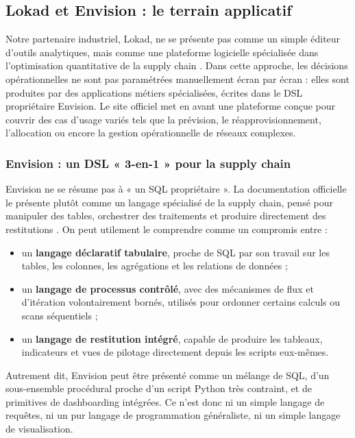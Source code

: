 \subsection{Lokad et Envision : le terrain applicatif}

Notre partenaire industriel, Lokad, ne se présente pas comme un simple éditeur d'outils analytiques, mais comme une plateforme logicielle spécialisée dans l'optimisation quantitative de la supply chain \cite{LokadEnvision}. Dans cette approche, les décisions opérationnelles ne sont pas paramétrées manuellement écran par écran : elles sont produites par des applications métiers spécialisées, écrites dans le DSL propriétaire Envision. Le site officiel met en avant une plateforme conçue pour couvrir des cas d'usage variés tels que la prévision, le réapprovisionnement, l'allocation ou encore la gestion opérationnelle de réseaux complexes.

\subsubsection{Envision : un DSL « 3-en-1 » pour la supply chain}

Envision ne se résume pas à « un SQL propriétaire ». La documentation officielle le présente plutôt comme un langage spécialisé de la supply chain, pensé pour manipuler des tables, orchestrer des traitements et produire directement des restitutions \cite{LokadEnvision}. On peut utilement le comprendre comme un compromis entre :
\begin{itemize}
    \item un \textbf{langage déclaratif tabulaire}, proche de SQL par son travail sur les tables, les colonnes, les agrégations et les relations de données ;
    \item un \textbf{langage de processus contrôlé}, avec des mécanismes de flux et d'itération volontairement bornés, utilisés pour ordonner certains calculs ou scans séquentiels ;
    \item un \textbf{langage de restitution intégré}, capable de produire les tableaux, indicateurs et vues de pilotage directement depuis les scripts eux-mêmes.
\end{itemize}

Autrement dit, Envision peut être présenté comme un mélange de SQL, d'un sous-ensemble procédural proche d'un script Python très contraint, et de primitives de dashboarding intégrées. Ce n'est donc ni un simple langage de requêtes, ni un pur langage de programmation généraliste, ni un simple langage de visualisation.

